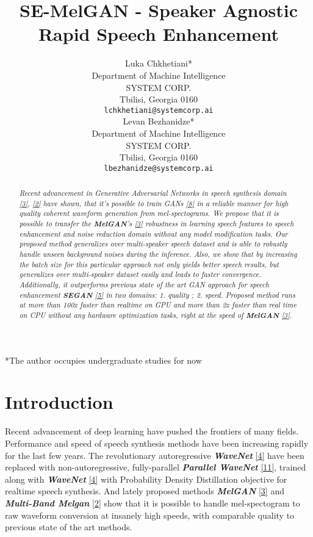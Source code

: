 \documentclass{article}
\title{SE-MelGAN - Speaker Agnostic Rapid Speech Enhancement}
\author{
  Luka Chkhetiani* \\
  Department of Machine Intelligence\\
  SYSTEM CORP.\\
  Tbilisi, Georgia 0160 \\
  \texttt{lchkhetiani@systemcorp.ai} \\
\And
  Levan Bezhanidze* \\
  Department of Machine Intelligence\\
  SYSTEM CORP.\\
  Tbilisi, Georgia 0160 \\
  \texttt{lbezhanidze@systemcorp.ai} \\
}
\begin{document}
\maketitle

\begin{abstract}
{\it Recent advancement in Generative Adversarial Networks in speech synthesis domain \hyperlink{refer}{[3]}, \hyperlink{refer}{[2]} have shown, that it's possible to train GANs \hyperlink{refer}{[8]} in a reliable manner for high quality coherent waveform generation from mel-spectograms. We propose that it is possible to transfer the \textit{\textbf{MelGAN}}'s \hyperlink{refer}{[3]} robustness in learning speech features to speech enhancement and noise reduction domain without any model modification tasks. Our proposed method generalizes over multi-speaker speech dataset and is able to robustly handle unseen background noises during the inference. Also, we show that by increasing the batch size for this particular approach not only yields better speech results, but generalizes over multi-speaker dataset easily and leads to faster convergence. Additionally, it outperforms previous state of the art GAN approach for speech enhancement  \textit{\textbf{SEGAN}} \hyperlink{refer}{[5]} in two domains: 1. quality ; 2. speed. Proposed method runs at more than 100x faster than realtime on GPU and more than 2x faster than real time on CPU without any hardware optimization tasks, right at the speed of \textit{\textbf{MelGAN}} \hyperlink{refer}{[3]}. }
\end{abstract}



{
*The author occupies undergraduate studies for now
}

\section{Introduction}
Recent advancement of deep learning have pushed the frontiers of many fields. Performance and speed of speech synthesis methods have been increasing rapidly for the last few years. The revolutionary autoregressive \textit{\textbf{WaveNet}} \hyperlink{refer}{[4]} have been replaced with non-autoregressive, fully-parallel \textit{\textbf{Parallel WaveNet}} \hyperlink{refer}{[11]}, trained along with \textit{\textbf{WaveNet}} \hyperlink{refer}{[4]} with Probability Density Distillation objective for realtime speech synthesis. And lately proposed methods \textit{\textbf{MelGAN}} \hyperlink{refer}{[3]} and \textit{\textbf{Multi-Band Melgan}} \hyperlink{refer}{[2]} show that it is possible to handle mel-spectogram to raw waveform conversion at insanely high speeds, with comparable quality to previous state of the art methods.
\end{document}
